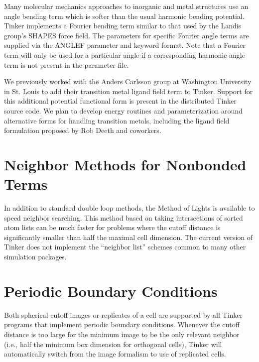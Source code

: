 \documentclass[letterpaper,11pt,english]{sphinxmanual}
\begin{document}
Many molecular mechanics approaches to inorganic and metal structures use an angle bending term which is softer than the usual harmonic bending potential. Tinker implements a Fourier bending term similar to that used by the Landis group’s SHAPES force field. The parameters for specific Fourier angle terms are supplied via the ANGLEF parameter and keyword format. Note that a Fourier term will only be used for a particular angle if a corresponding harmonic angle term is not present in the parameter file.

We previously worked with the Anders Carlsson group at Washington University in St. Louis to add their transition metal ligand field term to Tinker. Support for this additional potential functional form is present in the distributed Tinker source code. We plan to develop energy routines and parameterization around alternative forms for handling transition metals, including the ligand field formulation proposed by Rob Deeth and coworkers.


\section{Neighbor Methods for Nonbonded Terms}
\label{\detokenize{text/special-features:neighbor-methods-for-nonbonded-terms}}
In addition to standard double loop methods, the Method of Lights is available to speed neighbor searching. This method based on taking intersections of sorted atom lists can be much faster for problems where the cutoff distance is significantly smaller than half the maximal cell dimension. The current version of Tinker does not implement the “neighbor list” schemes common to many other simulation packages.


\section{Periodic Boundary Conditions}
\label{\detokenize{text/special-features:periodic-boundary-conditions}}
Both spherical cutoff images or replicates of a cell are supported by all Tinker programs that implement periodic boundary conditions. Whenever the cutoff distance is too large for the minimum image to be the only relevant neighbor (i.e., half the minimum box dimension for orthogonal cells), Tinker will automatically switch from the image formalism to use of replicated cells.
\end{document}
